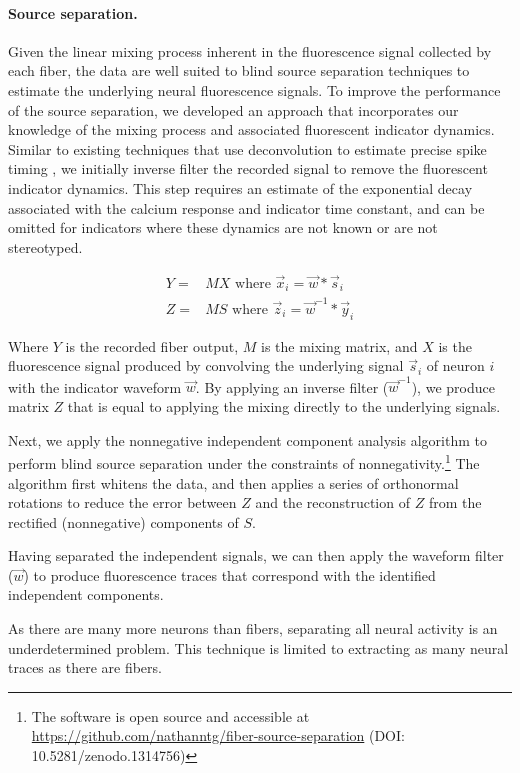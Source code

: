 \paragraph{Source separation.} Given the linear mixing process inherent in the fluorescence signal collected by each fiber, the data are well suited to blind source separation techniques to estimate the underlying neural fluorescence signals. To improve the performance of the source separation, we developed an approach that incorporates our knowledge of the mixing process and associated fluorescent indicator dynamics. Similar to existing techniques that use deconvolution to estimate precise spike timing \cite{Pnevmatikakis:2016gr}, we initially inverse filter the recorded signal to remove the fluorescent indicator dynamics. This step requires an estimate of the exponential decay associated with the calcium response and indicator time constant, and can be omitted for indicators where these dynamics are not known or are not stereotyped.

\begin{align}
Y = & M X \text{ where } \vec{x}_i = \vec{w} * \vec{s}_i \\
Z = & M S \text{ where } \vec{z}_i = \vec{w}^{-1} * \vec{y}_i
\end{align}

Where $Y$ is the recorded fiber output, $M$ is the mixing matrix, and $X$ is the fluorescence signal produced by convolving the underlying signal $\vec{s}_i$ of neuron $i$ with the indicator waveform $\vec{w}$. By applying an inverse filter ($\vec{w}^{-1}$), we produce matrix $Z$ that is equal to applying the mixing directly to the underlying signals.

Next, we apply the nonnegative independent component analysis algorithm \cite{Plumbley:2003dw} to perform blind source separation under the constraints of nonnegativity.\footnote{The software is open source and accessible at \url{https://github.com/nathanntg/fiber-source-separation} (DOI: 10.5281/zenodo.1314756)} The algorithm first whitens the data, and then applies a series of orthonormal rotations to reduce the error between $Z$ and the reconstruction of $Z$ from the rectified (nonnegative) components of $S$.

Having separated the independent signals, we can then apply the waveform filter ($\vec{w}$) to produce fluorescence traces that correspond with the identified independent components.

As there are many more neurons than fibers, separating all neural activity is an underdetermined problem. This technique is limited to extracting as many neural traces as there are fibers.

